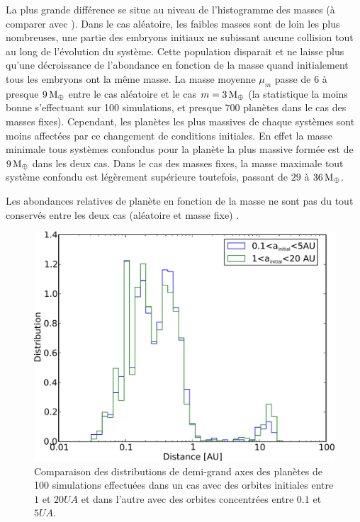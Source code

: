La plus grande différence se situe au niveau de l'histogramme des masses  (à comparer avec ). Dans le cas aléatoire, les faibles masses sont de loin les plus nombreuses, une partie des embryons initiaux ne subissant aucune collision tout au long de l'évolution du système. Cette population disparait et ne laisse plus qu'une décroissance de l'abondance en fonction de la masse quand initialement tous les embryons ont la même masse. La masse moyenne $\mu_m$ passe de $6$ à presque $9\mathrm{\thinspace M_\oplus}$ entre le cas aléatoire et le cas $m=3\mathrm{\thinspace M_\oplus}$ (la statistique la moins bonne s'effectuant sur 100 simulations, et presque $700$ planètes dans le cas des masses fixes). Cependant, les planètes les plus massives de chaque systèmes sont moins affectées par ce changement de conditions initiales. En effet la masse minimale tous systèmes confondus pour la planète la plus massive formée est de $9\mathrm{\thinspace M_\oplus}$ dans les deux cas. Dans le cas des masses fixes, la masse maximale tout système confondu est légèrement supérieure toutefois, passant de $29$ à $36\mathrm{\thinspace M_\oplus}$. 

Les abondances relatives de planète en fonction de la masse ne sont pas du tout conservés entre les deux cas (aléatoire et masse fixe) .

\bigskip

\begin{figure}[htb]
\centering
\includegraphics[width=0.65\linewidth]{figure/HSE/a_influence.pdf}
\caption{Comparaison des distributions de demi-grand axes des planètes de 100 simulations effectuées dans un cas avec des orbites initiales entre $1$ et $20\unit{UA}$ et dans l'autre avec des orbites concentrées entre $0.1$ et $5\unit{UA}$.}\label{fig:HSE_a_influence}
\end{figure}

